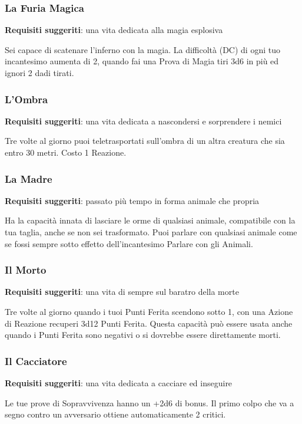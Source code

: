 \begin{multicols}{2}
\subsubsection{La Furia Magica}

\textbf{Requisiti suggeriti}: una vita dedicata alla magia esplosiva

Sei capace di scatenare l'inferno con la magia. La difficoltà (DC) di ogni tuo incantesimo aumenta di 2, quando fai una Prova di Magia tiri 3d6 in più ed ignori 2 dadi tirati.

\subsubsection{L'Ombra}

\textbf{Requisiti suggeriti}: una vita dedicata a nascondersi e sorprendere i nemici

Tre volte al giorno puoi teletrasportati sull'ombra di un altra creatura che sia entro 30 metri. Costo 1 Reazione.

\subsubsection{La Madre}

\textbf{Requisiti suggeriti}: passato più tempo in forma animale che propria

Ha la capacità innata di lasciare le orme di qualsiasi animale, compatibile con la tua taglia, anche se non sei trasformato. Puoi parlare con qualsiasi animale come se fossi sempre sotto effetto dell'incantesimo Parlare con gli Animali.

\subsubsection{Il Morto}

\textbf{Requisiti suggeriti}: una vita di sempre sul baratro della morte

Tre volte al giorno quando i tuoi Punti Ferita scendono sotto 1, con una Azione di Reazione recuperi 3d12 Punti Ferita. Questa capacità può essere usata anche quando i Punti Ferita sono negativi o si dovrebbe essere direttamente morti.

\subsubsection{Il Cacciatore}

\textbf{Requisiti suggeriti}: una vita dedicata a cacciare ed inseguire

Le tue prove di Sopravvivenza hanno un +2d6 di bonus. Il primo colpo che va a segno contro un avversario ottiene automaticamente 2 critici.

\end{multicols}

\pagebreak

